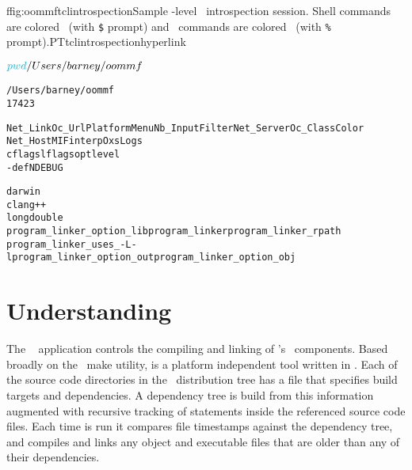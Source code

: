 \begin{codelisting}{f}{fig:oommftclintrospection}{Sample \Tcl-level
    \OOMMF\ introspection session. Shell commands are colored
    \shellcmd{\shellcmdcolorname}\ (with \texttt{\$} prompt) and
    \Tcl\ commands are colored \pgmcmd{\pgmcmdcolorname}\ (with
    \texttt{\%} prompt).}{PTtclintrospection}{hyperlink}
\begin{alltt}
$ \shellcmd{pwd}
/Users/barney/oommf
$ 
% \pgmcmd{set env(OOMMF_BUILD_ENVIRONMENT_NEEDED) 1}
% \pgmcmd{lappend auto_path [file join [pwd] pkg oc]}
% \pgmcmd{package require Oc}

% # Miscellaneous utilities from Oc_Main (oommf/pkg/oc/main.tcl)
% \pgmcmd{Oc_Main GetOOMMFRootDir}    ;# OOMMF root directory
/Users/barney/oommf
% \pgmcmd{Oc_Main GetPid}             ;# Process id
17423

% # Oc_Option database (oommf/config/options.tcl)
% # Code details in oommf/pkg/oc/option.tcl
% \pgmcmd{Oc_Option Get *}            ;# Registered Option classes (glob-match)
Net_Link Oc_Url Platform Menu Nb_InputFilter Net_Server Oc_Class Color
Net_Host MIFinterp OxsLogs {}
% \pgmcmd{Oc_Option Get Platform *}   ;# All options for class Platform (glob-match)
cflags lflags optlevel
% \pgmcmd{Oc_Option GetValue Platform cflags}  ;# Platform,cflags value
-def NDEBUG

% # Configuration values (oommf/config/platforms/<platform>.tcl)
% # Code details in oommf/pkg/oc/config.tcl
% \pgmcmd{set config [Oc_Config RunPlatform]}
% \pgmcmd{$config GetValue platform_name}                          ;# Platform name
darwin
% \pgmcmd{$config GetValue program_compiler_c++_name}              ;# C++ compiler
clang++
% \pgmcmd{$config GetValue program_compiler_c++_typedef_realwide}  ;# realwide typedef
long double
% \pgmcmd{$config Features program_linker*}             ;# GetValue names (glob-match)
program_linker_option_lib program_linker program_linker_rpath
program_linker_uses_-L-l program_linker_option_out program_linker_option_obj

% \pgmcmd{exit}                                ;# Exit Tcl shell
\end{alltt}\html{\newline}
\end{codelisting}


\section{Understanding }\label{sec:debug:pimake}
The \OOMMF\  application controls the compiling and linking
of \OOMMF's \Cplusplus\ components. Based broadly on the \Unix\ make
utility,  is a platform independent tool written in
\Tcl. Each of the source code directories in the \OOMMF\ distribution
tree has a  file that specifies build targets and
dependencies. A dependency tree is build from this information augmented
with recursive tracking of  statements inside the
referenced source code files.  Each time  is run it compares
file timestamps against the dependency tree, and compiles and links any
object and executable files that are older than any of their
dependencies.

